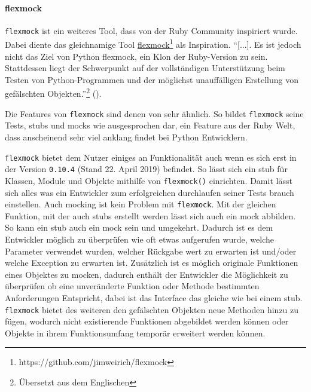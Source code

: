 \paragraph{flexmock}\label{python-tools:flexmock}\mbox{}
\newline
\lstinline{flexmock} ist ein weiteres Tool, dass von der Ruby Community inspiriert wurde.
Dabei diente das gleichnamige Tool
\href{https://github.com/jimweirich/flexmock}{flexmock}\footnote{https://github.com/jimweirich/flexmock}
als Inspiration.
"`[...]. Es ist jedoch nicht das Ziel von Python flexmock, ein Klon der
Ruby-Version zu sein. Stattdessen liegt der Schwerpunkt auf der vollständigen Unterstützung
beim Testen von Python-Programmen und der möglichst unauffälligen Erstellung von gefälschten
Objekten."'\footnote{Übersetzt aus dem Englischen} (\cite{flexmock:docs:0.10.3}).

Die Features von \lstinline{flexmock} sind denen von  sehr ähnlich.
So bildet \lstinline{flexmock} seine Tests, \glspl{stub} und \glspl{mock} wie ausgesprochen dar,
ein Feature aus der Ruby Welt, dass anscheinend sehr viel anklang findet bei Python Entwicklern.

\lstinline{flexmock} bietet dem Nutzer einiges an Funktionalität auch wenn es sich erst in der
Version \lstinline{0.10.4} (Stand 22. April 2019) befindet. So lässt sich ein \Gls{stub} für
Klassen, Module und Objekte mithilfe von \lstinline{flexmock()} einrichten. Damit lässt sich
alles was ein Entwickler zum erfolgreichen durchlaufen seiner Tests brauch einstellen. Auch
\gls{mock}ing ist kein Problem mit \lstinline{flexmock}. Mit der gleichen Funktion, mit der
auch \Glspl{stub} erstellt werden lässt sich auch ein \Gls{mock} abbilden. So kann ein
\Gls{stub} auch ein \Gls{mock} sein und umgekehrt.
Dadurch ist es dem Entwickler möglich zu überprüfen wie oft etwas aufgerufen wurde, welche
Parameter verwendet wurden, welcher Rückgabe wert zu erwarten ist und/oder welche Exception
zu erwarten ist.
Zusätzlich ist es möglich originale Funktionen eines Objektes zu \gls{mock}en, dadurch
enthält der Entwickler die Möglichkeit zu überprüfen ob eine unveränderte Funktion oder
Methode bestimmten Anforderungen Entspricht, dabei ist das Interface das gleiche wie bei
einem \Gls{stub}.
\lstinline{flexmock} bietet des weiteren den gefälschten Objekten neue Methoden hinzu zu fügen,
wodurch nicht existierende Funktionen abgebildet werden können oder Objekte in ihrem
Funktionsumfang temporär erweitert werden können.

